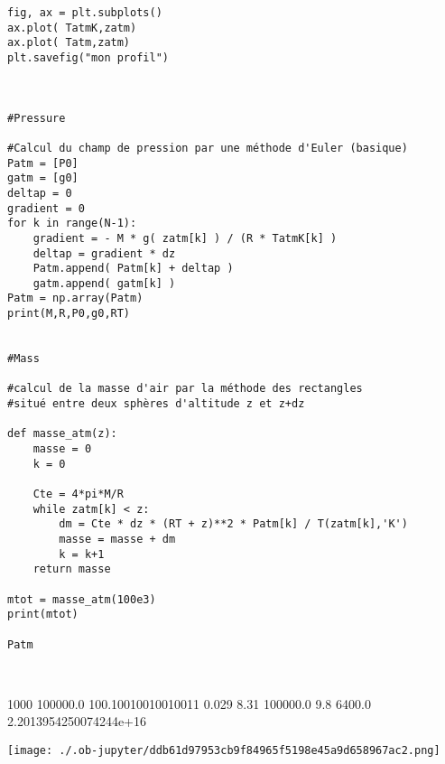 \documentclass[11pt]{article}
\begin{document}
\begin{verbatim}
fig, ax = plt.subplots()
ax.plot( TatmK,zatm)
ax.plot( Tatm,zatm)
plt.savefig("mon profil")



#Pressure

#Calcul du champ de pression par une méthode d'Euler (basique)
Patm = [P0]
gatm = [g0]
deltap = 0
gradient = 0
for k in range(N-1):
    gradient = - M * g( zatm[k] ) / (R * TatmK[k] )
    deltap = gradient * dz
    Patm.append( Patm[k] + deltap )
    gatm.append( gatm[k] )
Patm = np.array(Patm)
print(M,R,P0,g0,RT)


#Mass

#calcul de la masse d'air par la méthode des rectangles
#situé entre deux sphères d'altitude z et z+dz

def masse_atm(z):
    masse = 0
    k = 0
    
    Cte = 4*pi*M/R
    while zatm[k] < z:
        dm = Cte * dz * (RT + z)**2 * Patm[k] / T(zatm[k],'K')
        masse = masse + dm
        k = k+1
    return masse

mtot = masse_atm(100e3)
print(mtot)

Patm



\end{verbatim}

1000 100000.0 100.10010010010011
0.029 8.31 100000.0 9.8 6400.0
2.2013954250074244e+16
\begin{center}
\texttt{[image: ./.ob-jupyter/ddb61d97953cb9f84965f5198e45a9d658967ac2.png]}
\end{center}
\end{document}
